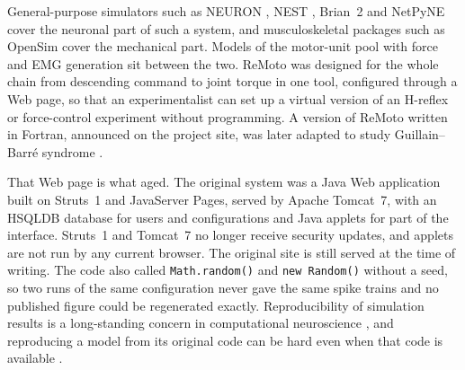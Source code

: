 \documentclass[pdflatex,sn-apa,iicol]{sn-jnl}
\providecommand{\code}[1]{\texttt{#1}}
\begin{document}
General-purpose simulators such as NEURON \citep{Hines1997}, NEST \citep{Gewaltig2007}, Brian~2 \citep{Stimberg2019} and NetPyNE \citep{DuraBernal2019} cover the neuronal part of such a system, and musculoskeletal packages such as OpenSim \citep{Delp2007} cover the mechanical part. Models of the motor-unit pool with force and EMG generation \citep{Fuglevand1993,Dideriksen2010} sit between the two. ReMoto was designed for the whole chain from descending command to joint torque in one tool, configured through a Web page, so that an experimentalist can set up a virtual version of an H-reflex or force-control experiment without programming. A version of ReMoto written in Fortran, announced on the project site, was later adapted to study Guillain--Barr\'e syndrome \citep{Oliveira2022}.

That Web page is what aged. The original system was a Java Web application built on Struts~1 and JavaServer Pages, served by Apache Tomcat~7, with an HSQLDB database for users and configurations and Java applets for part of the interface. Struts~1 and Tomcat~7 no longer receive security updates, and applets are not run by any current browser. The original site is still served at the time of writing.
The code also called \code{Math.random()} and \code{new Random()} without a seed, so two runs of the same configuration never gave the same spike trains and no published figure could be regenerated exactly. Reproducibility of simulation results is a long-standing concern in computational neuroscience \citep{Crook2013,McDougal2016,Eglen2017}, and reproducing a model from its original code can be hard even when that code is available \citep{Pauli2018,Rougier2017}.
\end{document}
